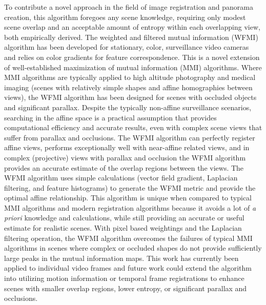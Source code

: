 %
%
%
%
%
%
%

%
%


To contribute a novel approach in the field of image registration and panorama creation, this algorithm foregoes any scene knowledge, requiring only modest scene overlap and an acceptable amount of entropy within each overlapping view, both empirically derived. The weighted and filtered mutual information (WFMI) algorithm has been developed for stationary, color, surveillance video cameras and relies on color gradients for feature correspondence. This is a novel extension of well-established maximization of mutual information (MMI) algorithms. Where MMI algorithms are typically applied to high altitude photography and medical imaging (scenes with relatively simple shapes and affine homographies between views), the WFMI algorithm has been designed for scenes with occluded objects and significant parallax. Despite the typically non-affine surveillance scenarios, searching in the affine space is a practical assumption that provides computational efficiency and accurate results, even with complex scene views that suffer from parallax and occlusions. The WFMI algorithm can perfectly register affine views, performs exceptionally well with near-affine related views, and in complex (projective) views with parallax and occlusion the WFMI algorithm provides an accurate estimate of the overlap regions between the views. The WFMI algorithm uses simple calculations (vector field gradient, Laplacian filtering, and feature histograms) to generate the WFMI metric and provide the optimal affine relationship. This algorithm is unique when compared to typical MMI algorithms and modern registration algorithms because it avoids a lot of \textit{a priori} knowledge and calculations, while still providing an accurate or useful estimate for realistic scenes. With pixel based weightings and the Laplacian filtering operation, the WFMI algorithm overcomes the failures of typical MMI algorithms in scenes where complex or occluded shapes do not provide sufficiently large peaks in the mutual information maps. This work has currently been applied to individual video frames and future work could extend the algorithm into utilizing motion information or temporal frame registrations to enhance scenes with smaller overlap regions, lower entropy, or significant parallax and occlusions.

